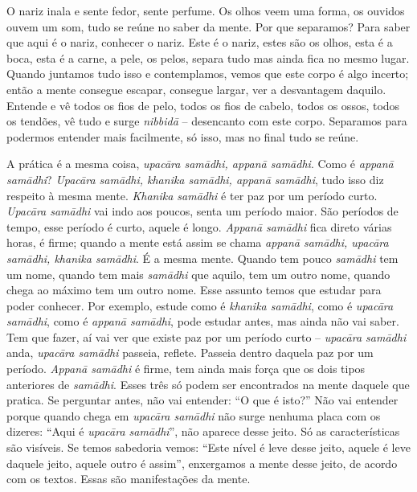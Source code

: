 O nariz inala e sente fedor, sente perfume. Os olhos veem uma forma,
os ouvidos ouvem um som, tudo se reúne no saber da mente. Por que
separamos? Para saber que aqui é o nariz, conhecer o nariz. Este é o
nariz, estes são os olhos, esta é a boca, esta é a carne, a pele, os
pelos, separa tudo mas ainda fica no mesmo lugar. Quando juntamos tudo
isso e contemplamos, vemos que este corpo é algo incerto; então a mente
consegue escapar, consegue largar, ver a desvantagem daquilo. Entende e
vê todos os fios de pelo, todos os fios de cabelo, todos os ossos,
todos os tendões, vê tudo e surge \textit{nibbid\=a} – desencanto com
este corpo. Separamos para podermos entender mais facilmente, só isso,
mas no final tudo se reúne. 

A prática é a mesma coisa, \textit{upac\=ara sam\=adhi, appan\=a
sam\=adhi}. Como é \textit{appan\=a sam\=adhi}?\textit{ Upac\=ara
sam\=adhi, khanika sam\=adhi, appan\=a sam\=adhi}, tudo isso diz
respeito à mesma mente. \textit{Khanika sam\=adhi }é ter paz por um
período curto. \textit{Upac\=ara sam\=adhi }vai indo aos poucos, senta
um período maior. São períodos de tempo, esse período é curto, aquele é
longo. \textit{Appan\=a sam\=adhi} fica direto várias horas, é firme;
quando a mente está assim se chama \textit{appan\=a sam\=adhi,
upac\=ara sam\=adhi, khanika sam\=adhi}. É a mesma mente. Quando tem
pouco \textit{sam\=adhi} tem um nome, quando tem mais
\textit{sam\=adhi} que aquilo, tem um outro nome, quando chega ao
máximo tem um outro nome. Esse assunto temos que estudar para poder
conhecer. Por exemplo, estude como é \textit{khanika sam\=adhi}, como é
\textit{upac\=ara sam\=adhi}, como é \textit{appan\=a sam\=adhi}, pode
estudar antes, mas ainda não vai saber. Tem que fazer, aí vai ver que
existe paz por um período curto – \textit{upac\=ara sam\=adhi }anda,
\textit{upac\=ara sam\=adhi }passeia, reflete. Passeia dentro daquela
paz por um período. \textit{Appan\=a sam\=adhi }é firme, tem ainda mais
força que os dois tipos anteriores de \textit{sam\=adhi}. Esses três só
podem ser encontrados na mente daquele que pratica. Se perguntar antes,
não vai entender: “O que é isto?” Não vai entender porque quando chega
em \textit{upac\=ara sam\=adhi }não surge nenhuma placa com os dizeres:
“Aqui é \textit{upac\=ara sam\=adhi}”, não aparece desse jeito. Só as
características são visíveis. Se temos sabedoria vemos: “Este nível é
leve desse jeito, aquele é leve daquele jeito, aquele outro é assim”,
enxergamos a mente desse jeito, de acordo com os textos. Essas são
manifestações da mente. 


